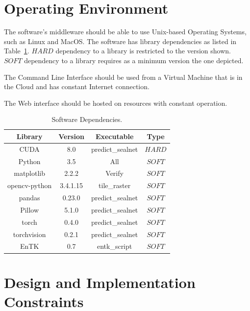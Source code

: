 \documentclass{scrreprt}
\begin{document}
\section{Operating Environment}

The software's middleware should be able to use Unix-based Operating Systems, such 
as Linux and MacOS. The software has library dependencies as listed in 
Table~\ref{tab:software_dependencies}. $HARD$ dependency to a library is restricted 
to the version shown. $SOFT$ dependency to a library requires as a minimum version 
the one depicted.

The Command Line Interface should be used from a Virtual Machine that is in the 
Cloud and has constant Internet connection.

The Web interface should be hosted on resources with constant operation.

\begin{table}
	\centering
	\begin{tabular}{|c|c|c|c|}
		\hline
		Library & Version & Executable & Type\\\hline
		CUDA          & 8.0      & predict\_sealnet & $HARD$\\\hline
		Python        & 3.5      & All              & $SOFT$\\\hline
		matplotlib    & 2.2.2    & Verify           & $SOFT$ \\\hline
		opencv-python & 3.4.1.15 & tile\_raster     & $SOFT$ \\\hline
		pandas        & 0.23.0   & predict\_sealnet & $SOFT$ \\\hline
		Pillow        & 5.1.0    & predict\_sealnet & $SOFT$ \\\hline
		torch         & 0.4.0    & predict\_sealnet & $SOFT$ \\\hline
		torchvision   & 0.2.1    & predict\_sealnet & $SOFT$ \\\hline
		EnTK          & 0.7      & entk\_script     & $SOFT$ \\\hline
		\hline
	\end{tabular}
	\caption{Software Dependencies.\label{tab:software_dependencies}}
\end{table}


\section{Design and Implementation Constraints}

\end{document}
